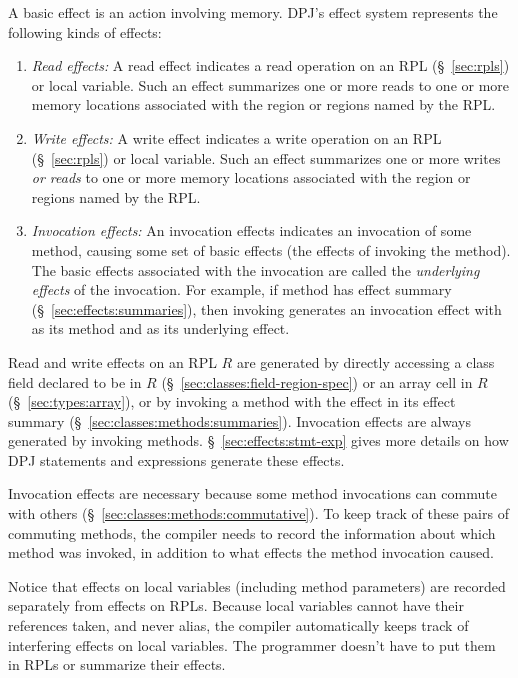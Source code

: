 A basic effect is an action involving memory.  DPJ's effect system
represents the following kinds of effects:
%
\begin{enumerate}
%
\item \emph{Read effects:} A read effect indicates a read operation on
  an RPL (\S~\ref{sec:rpls}) or local variable.  Such an effect
  summarizes one or more reads to one or more memory locations
  associated with the region or regions named by the RPL.
%
\item \emph{Write effects:} A write effect indicates a write operation
  on an RPL (\S~\ref{sec:rpls}) or local variable.  Such an effect
  summarizes one or more writes \emph{or reads} to one or more memory
  locations associated with the region or regions named by the RPL.
%
\item \emph{Invocation effects:} An invocation effects indicates an
  invocation of some method, causing some set of basic effects (the
  effects of invoking the method).  The basic effects associated with
  the invocation are called the \emph{underlying effects} of the
  invocation.  For example, if method  has effect summary
   (\S~\ref{sec:effects:summaries}), then invoking
   generates an invocation effect with  as its method
  and  as its underlying effect.
%
\end{enumerate}

Read and write effects on an RPL $R$ are generated by directly
accessing a class field declared to be in $R$
(\S~\ref{sec:classes:field-region-spec}) or an array cell in $R$
(\S~\ref{sec:types:array}), or by invoking a method with the effect in
its effect summary (\S~\ref{sec:classes:methods:summaries}).
Invocation effects are always generated by invoking methods.
\S~\ref{sec:effects:stmt-exp} gives more details on how DPJ statements
and expressions generate these effects.

Invocation effects are necessary because some method invocations can
commute with others (\S~\ref{sec:classes:methods:commutative}).  To
keep track of these pairs of commuting methods, the compiler needs to
record the information about which method was invoked, in addition to
what effects the method invocation caused.

Notice that effects on local variables (including method parameters)
are recorded separately from effects on RPLs.  Because local variables
cannot have their references taken, and never alias, the compiler
automatically keeps track of interfering effects on local variables.
The programmer doesn't have to put them in RPLs or summarize their
effects.

